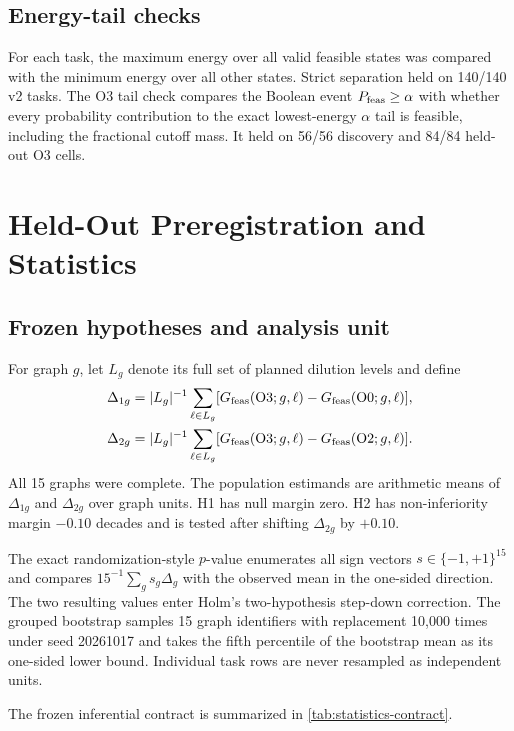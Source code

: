 \subsection{Energy-tail checks}

For each task, the maximum energy over all valid feasible states was compared
with the minimum energy over all other states. Strict separation held on
140/140 v2 tasks. The O3 tail check compares the Boolean event
$P_{\mathrm{feas}}\geq\alpha$ with whether every probability contribution to the exact
lowest-energy $\alpha$ tail is feasible, including the fractional cutoff mass.
It held on 56/56 discovery and 84/84 held-out O3 cells.

\section{Held-Out Preregistration and Statistics}
\label{app:statistics}

\subsection{Frozen hypotheses and analysis unit}

For graph $g$, let $L_g$ denote its full set of planned dilution levels and
define
\begin{align}
 \Delta_{1g}
 &=|L_g|^{-1}\sum_{\ell\in L_g}
 [G_{\mathrm{feas}}(\mathrm{O3};g,\ell)-G_{\mathrm{feas}}(\mathrm{O0};g,\ell)],\\
 \Delta_{2g}
 &=|L_g|^{-1}\sum_{\ell\in L_g}
 [G_{\mathrm{feas}}(\mathrm{O3};g,\ell)-G_{\mathrm{feas}}(\mathrm{O2};g,\ell)].
\end{align}
All 15 graphs were complete. The population estimands are arithmetic means of
$\Delta_{1g}$ and $\Delta_{2g}$ over graph units. H1 has null margin zero. H2
has non-inferiority margin $-0.10$ decades and is tested after shifting
$\Delta_{2g}$ by $+0.10$.

The exact randomization-style $p$-value enumerates all sign vectors
$s\in\{-1,+1\}^{15}$ and compares
$15^{-1}\sum_gs_g\Delta_g$ with the observed mean in the one-sided direction.
The two resulting values enter Holm's two-hypothesis step-down correction.
The grouped bootstrap samples 15 graph identifiers with replacement 10,000
times under seed 20261017 and takes the fifth percentile of the bootstrap mean
as its one-sided lower bound. Individual task rows are never resampled as
independent units.

The frozen inferential contract is summarized in
\cref{tab:statistics-contract}.



